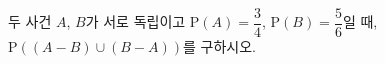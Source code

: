 두 사건 $A$, $B$가 서로 독립이고 $\mathrm{P}(A)=\dfrac{3}{4}$, $\mathrm{P}(B)=\dfrac{5}{6}$일 때, $\mathrm{P}((A-B)\cup(B-A))$를 구하시오.
